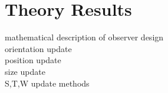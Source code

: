 \chapter{Theory Results}
mathematical description of observer design\\
orientation update\\
position update\\
size update\\
S,T,W update methods\\